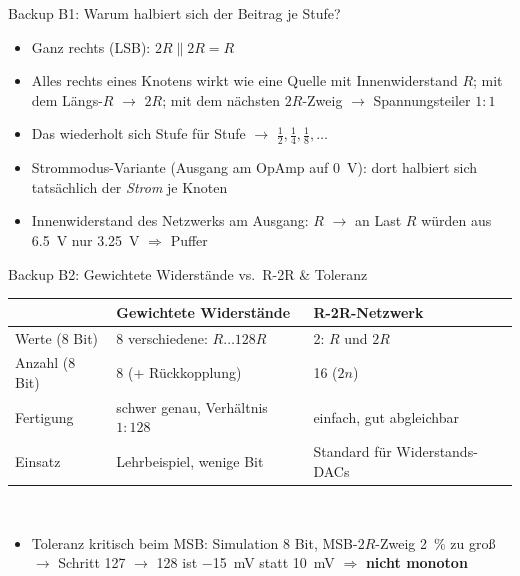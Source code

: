 \documentclass[aspectratio=169,11pt]{beamer}
\newif\ifkurzfassung
\begin{document}
\appendix
\ifkurzfassung\praxisfolie\fi

\begin{frame}{Backup B1: Warum halbiert sich der Beitrag je Stufe?}
  \begin{itemize}
    \item Ganz rechts (LSB): \(2R \parallel 2R = R\)
    \item Alles rechts eines Knotens wirkt wie eine Quelle mit Innenwiderstand \(R\); mit dem Längs-\(R\) \(\rightarrow\) \(2R\); mit dem nächsten \(2R\)-Zweig \(\rightarrow\) Spannungsteiler \(1:1\)
    \item Das wiederholt sich Stufe für Stufe \(\rightarrow\) \(\tfrac12, \tfrac14, \tfrac18, \dots\)
    \item Strommodus-Variante (Ausgang am OpAmp auf \SI{0}{V}): dort halbiert sich tatsächlich der \emph{Strom} je Knoten
    \item Innenwiderstand des Netzwerks am Ausgang: \(R\) \(\rightarrow\) an Last \(R\) würden aus \SI{6.5}{V} nur \SI{3.25}{V} \(\Rightarrow\) Puffer
  \end{itemize}
\end{frame}

\begin{frame}{Backup B2: Gewichtete Widerstände vs.\ R-2R \& Toleranz}
  \centering
  \begin{tabular}{@{}lll@{}}
    \toprule
    & Gewichtete Widerstände & R-2R-Netzwerk\\ \midrule
    Werte (8 Bit) & 8 verschiedene: \(R \dots 128R\) & 2: \(R\) und \(2R\)\\
    Anzahl (8 Bit) & 8 (+ Rückkopplung) & 16 (\(2n\))\\
    Fertigung & schwer genau, Verhältnis \(1:128\) & einfach, gut abgleichbar\\
    Einsatz & Lehrbeispiel, wenige Bit & Standard für Widerstands-DACs\\ \bottomrule
  \end{tabular}\\[5mm]
  \begin{itemize}\small
    \item Toleranz kritisch beim MSB: Simulation 8 Bit, MSB-\(2R\)-Zweig \SI{2}{\percent} zu groß \(\rightarrow\) Schritt 127 \(\rightarrow\) 128 ist \SI{-15}{mV} statt \SI{+10}{mV} \(\Rightarrow\) \textbf{nicht monoton}
  \end{itemize}
\end{frame}
\end{document}
